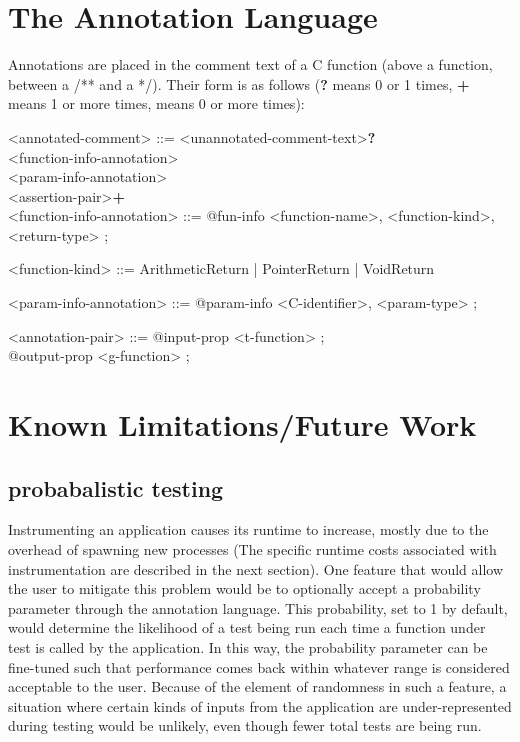 \documentclass[notitlepage]{article}
\begin{document}
\section{The Annotation Language}

Annotations are placed in the comment text of a C function (above a function, between a /** and a */). Their form is as follows ({\bf ?} means 0 or 1 times, {\bf +} means 1 or more times, {\bf *} means 0 or more times{\bf}):

\ttfamily

<annotated-comment> ::= <unannotated-comment-text>{\bf ?} \\
\phantom{1}\hspace{120pt}<function-info-annotation> \\
\phantom{1}\hspace{120pt}<param-info-annotation>{\bf *} \\
\phantom{1}\hspace{120pt}<assertion-pair>{\bf +} \\

<function-info-annotation> ::= @fun-info { <function-name>, <function-kind>, <return-type> } ;

<function-kind> ::= ArithmeticReturn | PointerReturn | VoidReturn

<param-info-annotation> ::= @param-info { <C-identifier>, <param-type> } ;

<annotation-pair> ::= @input-prop <t-function>{\bf *} ; \\
\phantom{1}\hspace{110pt}@output-prop <g-function> ;

\rmfamily

\section{Known Limitations/Future Work}

\subsection{probabalistic testing}

Instrumenting an application causes its runtime to increase, mostly due to the overhead of spawning new processes (The specific runtime costs associated with instrumentation are described in the next section). One feature that would allow the user to mitigate this problem would be to optionally accept a probability parameter through the annotation language. This probability, set to 1 by default, would determine the likelihood of a test being run each time a function under test is called by the application. In this way, the probability parameter can be fine-tuned such that performance comes back within whatever range is considered acceptable to the user. Because of the element of randomness in such a feature, a situation where certain kinds of inputs from the application are under-represented during testing would be unlikely, even though fewer total tests are being run.
\end{document}
